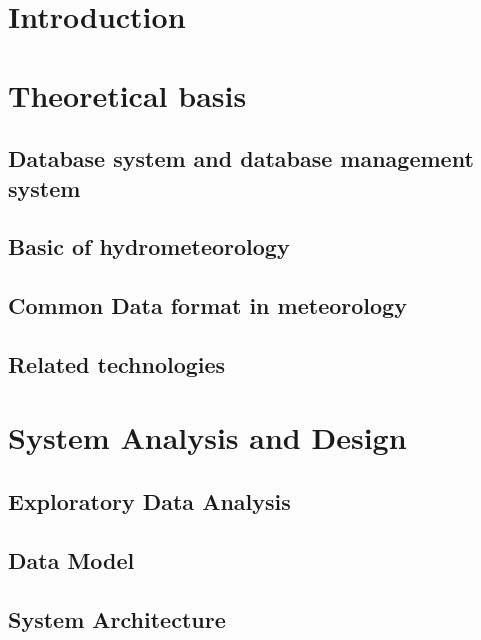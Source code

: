 \documentclass[12pt, a4paper]{report}
\begin{document}
\listoffigures
\listoftables


\chapter{Introduction}


\newpage

\chapter{Theoretical basis}
\section{Database system and database management system}

\section{Basic of hydrometeorology}

\section{Common Data format in meteorology}

\section{Related technologies}


\newpage
\chapter{System Analysis and Design}

\section{Exploratory Data Analysis}

\section{Data Model}

\section{System Architecture}

\end{document}
